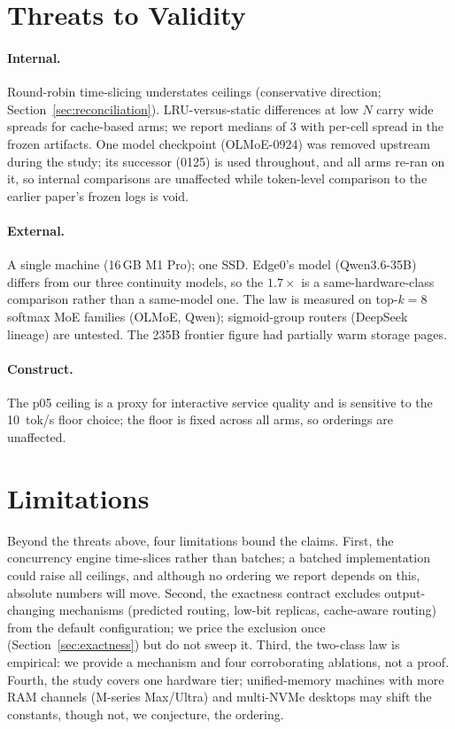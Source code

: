 \documentclass[11pt]{article}
\newcommand{\ppl}{\ensuremath{\times}}
\begin{document}
\section{Threats to Validity}
\label{sec:threats}

\paragraph{Internal.} Round-robin time-slicing understates ceilings
(conservative direction; Section~\ref{sec:reconciliation}). LRU-versus-static
differences at low $N$ carry wide spreads for cache-based arms; we report
medians of 3 with per-cell spread in the frozen artifacts. One model
checkpoint (OLMoE-0924) was removed upstream during the study; its successor
(0125) is used throughout, and all arms re-ran on it, so internal
comparisons are unaffected while token-level comparison to the earlier
paper's frozen logs is void.

\paragraph{External.} A single machine (16\,GB M1 Pro); one SSD. Edge0's
model (Qwen3.6-35B) differs from our three continuity models, so the
$1.7\ppl$ is a same-hardware-class comparison rather than a same-model one.
The law is measured on top-$k{=}8$ softmax MoE families (OLMoE, Qwen);
sigmoid-group routers (DeepSeek lineage) are untested. The 235B frontier
figure had partially warm storage pages.

\paragraph{Construct.} The p05 ceiling is a proxy for interactive service
quality and is sensitive to the \SI{10}{tok/s} floor choice; the floor is
fixed across all arms, so orderings are unaffected.

\section{Limitations}
\label{sec:limitations}

Beyond the threats above, four limitations bound the claims. First, the
concurrency engine time-slices rather than batches; a batched
implementation could raise all ceilings, and although no ordering we report
depends on this, absolute numbers will move. Second, the exactness contract
excludes output-changing mechanisms (predicted routing, low-bit replicas,
cache-aware routing) from the default configuration; we price the exclusion
once (Section~\ref{sec:exactness}) but do not sweep it. Third, the two-class
law is empirical: we provide a mechanism and four corroborating ablations,
not a proof. Fourth, the study covers one hardware tier; unified-memory
machines with more RAM channels (M-series Max/Ultra) and multi-NVMe desktops
may shift the constants, though not, we conjecture, the ordering.
\end{document}

